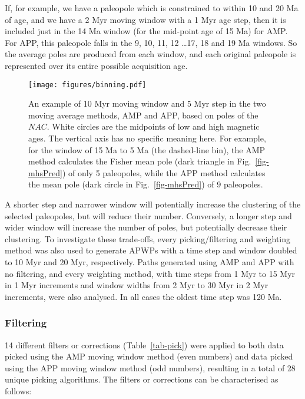 If, for example, we have a paleopole which is constrained to within 10 and 20 Ma
of age, and we have a 2 Myr moving window with a 1 Myr age step, then it
is included just in the 14 Ma window (for the mid-point age of 15
Ma) for AMP\@. For APP, this paleopole falls in the 9,
10, 11, 12 \ldots 17,
18 and 19 Ma windows. So the average poles are
produced from each window, and each original paleopole is represented over its
entire possible acquisition age.

\begin{figure}
\centering
\texttt{[image: figures/binning.pdf]}
\caption[Moving average (MA) methods]{An example of 10 Myr moving window and 5
Myr step in the two moving average methods, AMP and APP, based on poles of the
$NAC$. White circles are the midpoints of low and high magnetic ages. The
vertical axis has no specific meaning here. For example, for the window of 15 Ma
to 5 Ma (the dashed-line bin), the AMP method calculates the Fisher mean pole
(dark triangle in Fig.~\ref{fig-mhsPred}) of only 5 paleopoles, while the APP
method calculates the mean pole (dark circle in Fig.~\ref{fig-mhsPred}) of 9
paleopoles.}\label{fig-nac-maplat}
\end{figure}

A shorter step and narrower window will potentially increase the clustering of
the selected paleopoles, but will reduce their number. Conversely, a longer step
and wider window will increase the number of poles, but potentially decrease
their clustering. To investigate these trade-offs, every picking/filtering and
weighting method was also used to generate APWPs with a time step and window
doubled to 10 Myr and 20 Myr, respectively. Paths generated using AMP and APP
with no filtering, and every weighting method, with time steps from 1 Myr to 15
Myr in 1 Myr increments and window widths from 2 Myr to 30 Myr in 2 Myr
increments, were also analysed. In all cases the oldest time step was 120 Ma.

\subsubsection{Filtering}

14 different filters or corrections (Table~\ref{tab-pick}) were applied to both
data picked using the AMP moving window method (even numbers) and data picked
using the APP moving window method (odd numbers), resulting in a total of 28
unique picking algorithms. The filters or corrections can be characterised as
follows:

